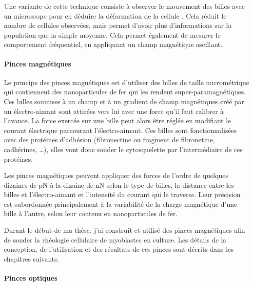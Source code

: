 Une variante de cette technique consiste à observer le mouvement des billes avec un microscope pour en déduire la déformation de la cellule \parencite{fabry_scaling_2001}. Cela réduit le nombre de cellules observées, mais permet d'avoir plus d'informations sur la population que la simple moyenne. Cela permet également de mesurer le comportement fréquentiel, en appliquant un champ magnétique oscillant. 






\paragraph{Pinces magnétiques}

Le principe des pinces magnétiques est d'utiliser des billes de taille micrométrique qui contiennent des nanoparticules de fer qui les rendent super-paramagnétiques.
Ces billes soumises à un champ et à un gradient de champ magnétiques créé par un électro-aimant sont attirées vers lui avec une force qu'il faut calibrer à l'avance.
La force exercée sur une bille peut alors être réglée en modifiant le courant électrique parcourant l'électro-aimant.
Ces billes sont fonctionnalisées avec des protéines d'adhésion (fibronectine ou fragment de fibronetine, cadhérines, \dots), elles vont donc sonder le cytosquelette par l'intermédiaire de ces protéines. 


Les pinces magnétiques peuvent appliquer des forces de l'ordre de quelques dizaines de pN à la dizaine de nN selon le type de billes, la distance entre les billes et l’électro-aimant et l’intensité du courant qui le traverse. 
Leur précision est subordonnée principalement à la variabilité de la charge magnétique d'une bille à l'autre, selon leur contenu en nanoparticules de fer. 


Durant le début de ma thèse, j'ai construit et utilisé des pinces magnétiques afin de sonder la rhéologie cellulaire de myoblastes en culture. Les détails de la conception, de l'utilisation et des résultats de ces pinces sont décrits dans les chapitres suivants. 


\paragraph{Pinces optiques}

